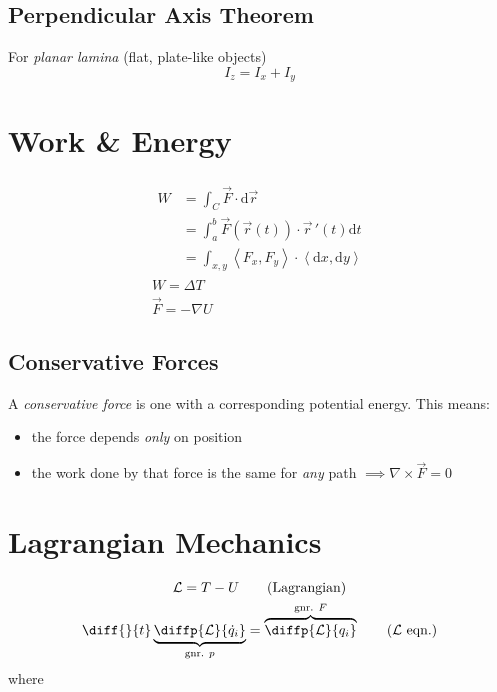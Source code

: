 \documentclass[tbtags]{cheatsheet}
\begin{document}
		\subsection{Perpendicular Axis Theorem}
			For \emph{planar lamina} (flat, plate-like objects)
			\[ I_z = I_x + I_y \]


	\section{Work \& Energy}
		\begin{gather*}
			\begin{split}
			W &= \int_C \vec{F} \cdot \mathrm{d}\vec{r}	\\
			&= \int_{a}^b \vec{F}\left( \vec{r}(t) \right) \cdot \vec{r}\,'(t)\mathrm{d}t \\
			&= \int_{x,y} \left\langle F_x, F_y \right\rangle \cdot \left\langle \mathrm{d}x, \mathrm{d}y \right\rangle
			\end{split}\tag{work integral}\\
			W = \Delta T	\tag{Work-Energy Theorem}\\
			\vec F = -\nabla U	\tag{potential from force}
		\end{gather*}


		\subsection{Conservative Forces}
			A \emph{conservative force} is one with a corresponding potential energy. This means:
			\begin{itemize}
				\item the force depends \emph{only} on position
				\item the work done by that force is the same for \emph{any} path $\implies \nabla \times \vec F = 0$
			\end{itemize}

	\section{Lagrangian Mechanics}
			\begin{gather*}
				\mathcal{L} = T - U	\tag{Lagrangian}\\
				\diff{}{t} \underbrace{\diffp{\mathcal{L}}{{\dot{q}_i}}}_\text{gnr. $p$} =  \overbrace{\diffp{\mathcal{L}}{{q_i}}}^\text{gnr. $F$}	\tag{$\mathcal{L}$ eqn.}
			\end{gather*}
			where 
			
\end{document}
